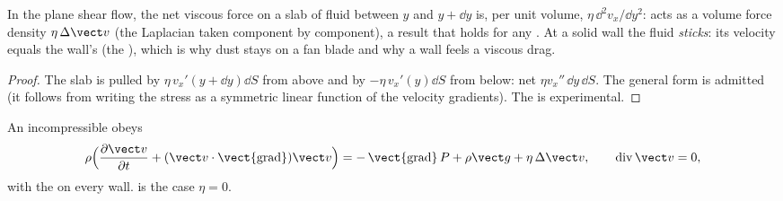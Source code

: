 \begin{proposition}\label{prop:b2:viscous-flows:density}
In the plane shear flow, the net viscous force on a slab of fluid
between $y$ and $y + \dd y$ is, per unit volume, $\eta\,\dd^2v_x/\dd y^2$:
 acts as a volume force density $\eta\,\Delta\vect v$ (the
Laplacian taken component by component), a result that holds for any
. At a solid wall the fluid \emph{sticks}: its
velocity equals the wall's (the \emph{}), which is why
dust stays on a fan blade and why a wall feels a viscous drag.
\end{proposition}

\begin{proof}
The slab is pulled by $\eta\,v_x'(y + \dd y)\dd S$ from above and by
$-\eta\,v_x'(y)\dd S$ from below: net $\eta v_x''\,\dd y\,\dd S$. The general
form is admitted (it follows from writing the stress as a symmetric
linear function of the velocity gradients). The  is
experimental.
\end{proof}

\begin{theorem}\label{thm:b2:viscous-flows:ns}
An incompressible  obeys
\[
\rho\Bigl(\frac{\partial\vect v}{\partial t} + (\vect v\cdot\operatorname{\vect{grad}})
\vect v\Bigr) = -\operatorname{\vect{grad}}P + \rho\vect g + \eta\,\Delta\vect v ,
\qquad \operatorname{div}\vect v = 0 ,
\]
with the  on every wall.  is the case
$\eta = 0$.
\end{theorem}
\admitted

